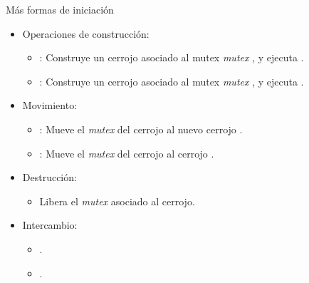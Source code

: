 \begin{frame}{Más formas de iniciación}
\begin{itemize}
  \item Operaciones de construcción:
    \begin{itemize}
      \item {}: Construye un cerrojo asociado al mutex \emph{mutex} , y ejecuta .
      \item {}: Construye un cerrojo asociado al mutex \emph{mutex} , y ejecuta .
    \end{itemize}
  \item Movimiento:
    \begin{itemize}
      \item {}: Mueve el \emph{mutex} del cerrojo  al nuevo cerrojo .
      \item {}: Mueve el \emph{mutex} del cerrojo  al cerrojo .
    \end{itemize}
  \item Destrucción: 
    \begin{itemize}
      \item Libera el \emph{mutex} asociado al cerrojo.
    \end{itemize}
  \item Intercambio:
    \begin{itemize}
      \item {}.
      \item {}.
    \end{itemize}
\end{itemize}
\end{frame}

